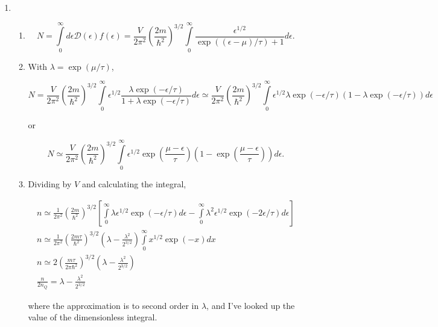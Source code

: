 \documentclass{article}
\begin{document}
\begin{enumerate}
\begin{enumerate}
	\end{enumerate}

	\item

	\begin{enumerate}

		\item

		$$N = \int \limits_0^\infty  d\epsilon \mathcal{D}(\epsilon) f(\epsilon) = \frac{V}{2\pi^2} \left( \frac{2m}{\hbar^2} \right)^{3/2} \int \limits_0^\infty \frac{\epsilon^{1/2}}{\exp((\epsilon - \mu)/\tau) + 1} d\epsilon.$$

		\item

		With $\lambda = \exp(\mu/\tau)$,

		$$N = \frac{V}{2\pi^2} \left( \frac{2m}{\hbar^2} \right)^{3/2} \int \limits_0^\infty \epsilon^{1/2}\frac{ \lambda \exp(-\epsilon/\tau)}{1 + \lambda \exp(-\epsilon/\tau)} d\epsilon \simeq \frac{V}{2\pi^2} \left( \frac{2m}{\hbar^2} \right)^{3/2} \int \limits_0^\infty \epsilon^{1/2} \lambda \exp(-\epsilon/\tau) (1 - \lambda \exp(-\epsilon/\tau)) d\epsilon $$

		or

		$$N \simeq \frac{V}{2\pi^2} \left( \frac{2m}{\hbar^2} \right)^{3/2} \int \limits_0^\infty \epsilon^{1/2} \exp\left( \frac{\mu-\epsilon}{\tau} \right) \left(1 - \exp \left(\frac{\mu -\epsilon}{\tau}\right) \right) d\epsilon.$$

		\item

		Dividing by $V$ and calculating the integral,

		\begin{gather*}
		n \simeq \frac{1}{2\pi^2} \left( \frac{2m}{\hbar^2} \right)^{3/2} \left[ \int \limits_0^\infty  \lambda \epsilon^{1/2}\exp(-\epsilon/\tau) d\epsilon - \int \limits_0^\infty  \lambda^2 \epsilon^{1/2}\exp(-2\epsilon/\tau) d\epsilon \right] \\
		n \simeq \frac{1}{2\pi^2} \left( \frac{2m \tau}{\hbar^2} \right)^{3/2} \left(\lambda - \frac{\lambda^2}{2^{3/2}} \right) \int \limits_0^\infty x^{1/2}\exp(-x) dx  \\
		n \simeq 2 \left( \frac{m \tau}{2 \pi \hbar^2} \right)^{3/2}\left(\lambda - \frac{\lambda^2}{2^{3/2}} \right) \\
		\frac{n}{2n_Q} = \lambda - \frac{\lambda^2}{2^{3/2}}
		\end{gather*}

		where the approximation is to second order in $\lambda$, and I've looked up the value of the dimensionless integral.


\end{enumerate}
\end{enumerate}
\end{document}
